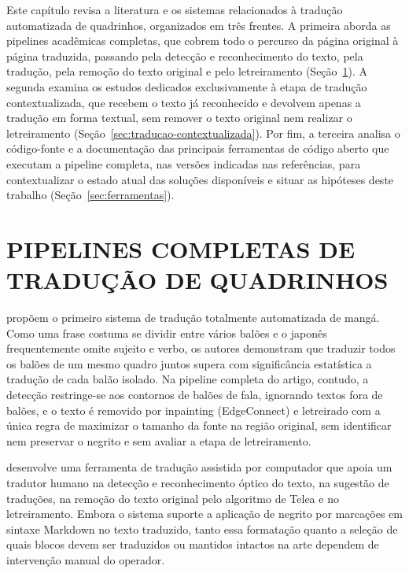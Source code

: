 \documentclass[
    12pt,
    openright,
    oneside,
    a4paper,
    chapter=TITLE,
    section=TITLE,
    english,
    brazilian,
    brazil
]{abntex2}
\begin{document}
Este capítulo revisa a literatura e os sistemas relacionados à tradução automatizada de quadrinhos, organizados em três frentes. A primeira aborda as pipelines acadêmicas completas, que cobrem todo o percurso da página original à página traduzida, passando pela detecção e reconhecimento do texto, pela tradução, pela remoção do texto original e pelo letreiramento (Seção~\ref{sec:pipelines-completas}). A segunda examina os estudos dedicados exclusivamente à etapa de tradução contextualizada, que recebem o texto já reconhecido e devolvem apenas a tradução em forma textual, sem remover o texto original nem realizar o letreiramento (Seção~\ref{sec:traducao-contextualizada}). Por fim, a terceira analisa o código-fonte e a documentação das principais ferramentas de código aberto que executam a pipeline completa, nas versões indicadas nas referências, para contextualizar o estado atual das soluções disponíveis e situar as hipóteses deste trabalho (Seção~\ref{sec:ferramentas}).

\section{PIPELINES COMPLETAS DE TRADUÇÃO DE QUADRINHOS}
\label{sec:pipelines-completas}

 propõem o primeiro sistema de tradução totalmente automatizada de mangá. Como uma frase costuma se dividir entre vários balões e o japonês frequentemente omite sujeito e verbo, os autores demonstram que traduzir todos os balões de um mesmo quadro juntos supera com significância estatística a tradução de cada balão isolado. Na pipeline completa do artigo, contudo, a detecção restringe-se aos contornos de balões de fala, ignorando textos fora de balões, e o texto é removido por inpainting (EdgeConnect) e letreirado com a única regra de maximizar o tamanho da fonte na região original, sem identificar nem preservar o negrito e sem avaliar a etapa de letreiramento.

 desenvolve uma ferramenta de tradução assistida por computador que apoia um tradutor humano na detecção e reconhecimento óptico do texto, na sugestão de traduções, na remoção do texto original pelo algoritmo de Telea e no letreiramento. Embora o sistema suporte a aplicação de negrito por marcações em sintaxe Markdown no texto traduzido, tanto essa formatação quanto a seleção de quais blocos devem ser traduzidos ou mantidos intactos na arte dependem de intervenção manual do operador.
\end{document}
